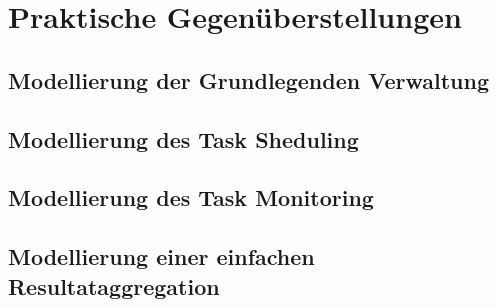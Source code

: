 \chapter{Praktische Gegenüberstellungen}
\section{Modellierung der Grundlegenden Verwaltung}
\section{Modellierung des Task Sheduling}
\section{Modellierung des Task Monitoring}
\section{Modellierung einer einfachen Resultataggregation}
